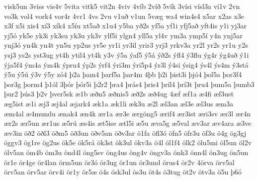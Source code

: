 {visk5un
3viss
vis4v
5vita
vitk5
vit2n
4viv
4víb
2víð
5vík
3vísi
vísl3a
ví1v
2vn
vo3k
vol4
vork4
vor4r
4vr1
4vs
2vu
v1uð
v1un
5væg
wa4
win4s4
x5ar
x2as
x3e
x3f
x5i
xis4
xí3
xík4
x5íu
xt5að
x1u4
y5ba
yð2s
yf5a
yf1i
yfj5að
yft4is
y1i
yj3ar
yj5ó
yk5e
yk3i
yk3su
yk3u
yk3v
ylf5i
ylgn4
yll5a
yl4v
ym3a
ymp5í
y4n
ynj5ar
ynj3ó
yn4k
yn4t
yn5u
yp2us
yr5e
yr1i
yr3il
yrir3
yrj3
yrkv3a
yr2l
yr2s
yr1u
y2s
ysj3
ys2s
yst3ug
yt4h
ytil4
yt4k
y3v
ý5a
ýaf5
ý5á
ýð2s
ýfl4
ý3flu
ýg4r
ýg4uð
ý1i
ýja5f4
ým4a
ým4k
ýpru4
ýp2s
ýrf4
ýri3m
ýri5p4
ýr3l
ý4si
ýsig4
ýs4l
ýs4m
ý3stá
ý5u
ý5ú
ý3v
ý5y
zó4
þ2a
þam4
þarf5a
þar4m
4þb
þ2i
þist3i
þjó4
þol5a
þor3f4
þor3g
þorm4
þ1ól
3þór
þór5i
þ2r2
þra4
þrás4
þris4
þríl4
þrí3t
þru4
þum5a
þumb3
þur2
þús3
þ2v
þver5sk
æ1b
æðn5
æðnis5
æð2s
æð4ug
4æf
æf1a
æ4fi
æf3ust
æg5ist
æ1i
æj3
æj4al
æjark4
æk1a
æk1li
æk3u
æ2l
æl3an
æl3e
æl3us
æm3a
æm4al
æ4mundu
ænak4
æn4k
ær1a
ær3e
ærgöng5
ærif4
ær3ist
æri3sv
ær3l
ær4n
ær2s
ær5un
ær1us
æ5rú
æs4is
æt5ise
ætl5i
æ5u
æva5g
æ5val
æv3ar
æv4ara
æ3ve
æv3in
öð2
öðl3
öðm5
öð3un
öðv5an
öðv3ar
ö1fa
öfl3ó
öfn5
öfr3u
öf3u
ö4g
ög3gj
öggv3
ög1re
ög2us
ök5e
ök5rá
ök3st
ök3ul
ökv3a
ö4l
öl1f4
ölk2
ölu5mi
öl5un
öl2v
ölv5an
öm4b
öm3u
önd4l
öng5sv
öng4us
öng4v
öngv3a
önk3
önn4l
ön3ug
ön5un
ör1e
ör4ge
ör4lan
örm5un
ör3ó
ör3ug
ör1un
ör3und
örus4
ör2v
4örva
örv5al
örv5an
örv5ar
örv4i
ör1y
ör5æ
ö4s
ösk3ul
ös3u
öt4s
ö3tug
öt2v
ötv3a
ö5u
þ6ó
}
